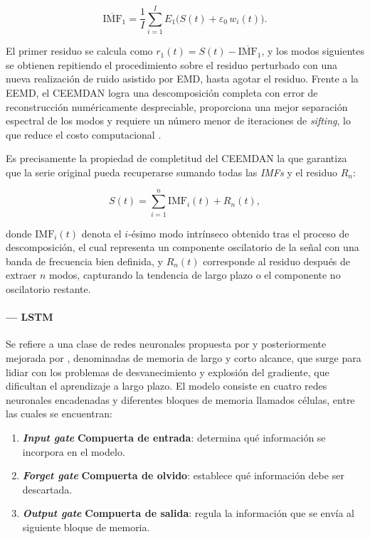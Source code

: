 \documentclass[12pt]{paper}
\begin{document}
\begin{equation}
    \overline{\mathrm{IMF}}_1 = \frac{1}{I}\sum_{i=1}^{I} E_1\bigl(S(t) + \varepsilon_0\,w_i(t)\bigr).
\end{equation}

El primer residuo se calcula como $r_1(t) = S(t) - \overline{\mathrm{IMF}}_1$, y los modos siguientes se obtienen repitiendo el procedimiento sobre el residuo perturbado con una nueva realización de ruido asistido por EMD, hasta agotar el residuo. Frente a la EEMD, el CEEMDAN logra una descomposición completa con error de reconstrucción numéricamente despreciable, proporciona una mejor separación espectral de los modos y requiere un número menor de iteraciones de \textit{sifting}, lo que reduce el costo computacional \citep{torres2011ceemdan}.

Es precisamente la propiedad de completitud del CEEMDAN la que garantiza que la serie original pueda recuperarse sumando todas las \textit{IMFs} y el residuo $R_n$:

\begin{equation}
 S(t) = \sum_{i=1}^{n} \mathrm{IMF}_i(t) + R_n(t),
\end{equation}

donde $\mathrm{IMF}_i(t)$ denota el $i$-ésimo modo intrínseco obtenido tras el proceso de descomposición, el cual representa un componente oscilatorio de la señal con una banda de frecuencia bien definida, y $R_n(t)$ corresponde al residuo después de extraer $n$ modos, capturando la tendencia de largo plazo o el componente no oscilatorio restante.

\paragraph{--- LSTM}
Se refiere a una clase de redes neuronales propuesta por \cite{hochreiter1997lstm} y posteriormente mejorada por \cite{graves2006ctc}, denominadas de memoria de largo y corto alcance, que surge para lidiar con los problemas de desvanecimiento y explosión del gradiente, que dificultan el aprendizaje a largo plazo. El modelo consiste en cuatro redes neuronales encadenadas y diferentes bloques de memoria llamados células, entre las cuales se encuentran:

\begin{enumerate}
    \item \textit{\textbf{Input gate}} \textbf{Compuerta de entrada}: determina qué información se incorpora en el modelo.
    \item \textit{\textbf{Forget gate}} \textbf{Compuerta de olvido}: establece qué información debe ser descartada.
    \item \textit{\textbf{Output gate}} \textbf{Compuerta de salida}: regula la información que se envía al siguiente bloque de memoria.
\end{enumerate}
\end{document}
